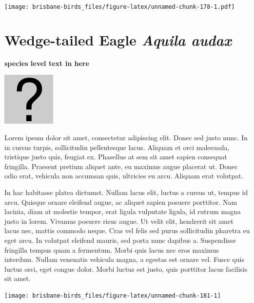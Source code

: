 \documentclass[]{book}
\let\origfigure\figure
\let\endorigfigure\endfigure
\renewenvironment{figure}[1][2] {
  \expandafter\origfigure\expandafter[H]
} {
  \endorigfigure
}
\begin{document}
\begin{figure}
\centering
\texttt{[image: brisbane-birds\_files/figure-latex/unnamed-chunk-178-1.pdf]}
\caption{\label{fig:unnamed-chunk-178}insert figure caption}
\end{figure}

\section{\texorpdfstring{Wedge-tailed Eagle \emph{Aquila
audax}}{Wedge-tailed Eagle Aquila audax}}\label{wedge-tailed-eagle-aquila-audax}

\textbf{species level text in here}

\begin{figure}
\centering
\includegraphics{assets/missing.png}
\caption{No image for species}
\end{figure}

Lorem ipsum dolor sit amet, consectetur adipiscing elit. Donec sed justo
nunc. In in cursus turpis, sollicitudin pellentesque lacus. Aliquam et
orci malesuada, tristique justo quis, feugiat ex. Phasellus at sem sit
amet sapien consequat fringilla. Praesent pretium aliquet ante, eu
maximus augue placerat ut. Donec odio erat, vehicula non accumsan quis,
ultricies eu arcu. Aliquam erat volutpat.

In hac habitasse platea dictumst. Nullam lacus elit, luctus a cursus ut,
tempus id arcu. Quisque ornare eleifend augue, ac aliquet sapien posuere
porttitor. Nam lacinia, diam at molestie tempor, erat ligula vulputate
ligula, id rutrum magna justo in lorem. Vivamus posuere risus augue. Ut
velit elit, hendrerit sit amet lacus nec, mattis commodo neque. Cras vel
felis sed purus sollicitudin pharetra eu eget arcu. In volutpat eleifend
mauris, sed porta nunc dapibus a. Suspendisse fringilla tempus quam a
fermentum. Morbi quis lacus nec eros maximus interdum. Nullam venenatis
vehicula magna, a egestas est ornare vel. Fusce quis luctus orci, eget
congue dolor. Morbi luctus est justo, quis porttitor lacus facilisis sit
amet.

\begin{figure}
\texttt{[image: brisbane-birds\_files/figure-latex/unnamed-chunk-181-1]} \caption{insert figure caption}\label{fig:unnamed-chunk-181}
\end{figure}
\end{document}

